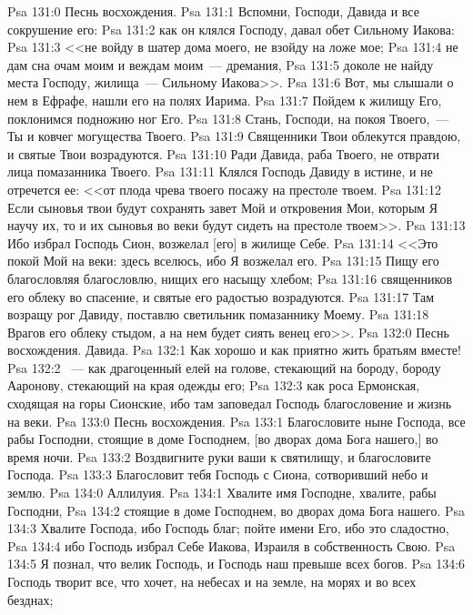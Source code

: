 \vs Psa 131:0 Песнь восхождения.
\rsbpar\vs Psa 131:1 Вспомни, Господи, Давида и все сокрушение его:
\vs Psa 131:2 как он клялся Господу, давал обет Сильному Иакова:
\vs Psa 131:3 <<не войду в шатер дома моего, не взойду на ложе мое;
\vs Psa 131:4 не дам сна очам моим и веждам моим~--- дремания,
\vs Psa 131:5 доколе не найду места Господу, жилища~--- Сильному Иакова>>.
\vs Psa 131:6 Вот, мы слышали о нем в Ефрафе, нашли его на полях Иарима.
\vs Psa 131:7 Пойдем к жилищу Его, поклонимся подножию ног Его.
\vs Psa 131:8 Стань, Господи, на  покоя Твоего,~--- Ты и ковчег могущества Твоего.
\vs Psa 131:9 Священники Твои облекутся правдою, и святые Твои возрадуются.
\vs Psa 131:10 Ради Давида, раба Твоего, не отврати лица помазанника Твоего.
\vs Psa 131:11 Клялся Господь Давиду в истине, и не отречется ее: <<от плода чрева твоего посажу на престоле твоем.
\vs Psa 131:12 Если сыновья твои будут сохранять завет Мой и откровения Мои, которым Я научу их, то и их сыновья во веки будут сидеть на престоле твоем>>.
\vs Psa 131:13 Ибо избрал Господь Сион, возжелал [его] в жилище Себе.
\vs Psa 131:14 <<Это покой Мой на веки: здесь вселюсь, ибо Я возжелал его.
\vs Psa 131:15 Пищу его благословляя благословлю, нищих его насыщу хлебом;
\vs Psa 131:16 священников его облеку во спасение, и святые его радостью возрадуются.
\vs Psa 131:17 Там возращу рог Давиду, поставлю светильник помазаннику Моему.
\vs Psa 131:18 Врагов его облеку стыдом, а на нем будет сиять венец его>>.
\vs Psa 132:0 Песнь восхождения. Давида.
\rsbpar\vs Psa 132:1 Как хорошо и как приятно жить братьям вместе!
\vs Psa 132:2 ~--- как драгоценный елей на голове, стекающий на бороду, бороду Ааронову, стекающий на края одежды его;
\vs Psa 132:3 как роса Ермонская, сходящая на горы Сионские, ибо там заповедал Господь благословение и жизнь на веки.
\vs Psa 133:0 Песнь восхождения.
\rsbpar\vs Psa 133:1 Благословите ныне Господа, все рабы Господни, стоящие в доме Господнем, [во дворах дома Бога нашего,] во время ночи.
\vs Psa 133:2 Воздвигните руки ваши к святилищу, и благословите Господа.
\vs Psa 133:3 Благословит тебя Господь с Сиона, сотворивший небо и землю.
\vs Psa 134:0 Аллилуия.
\rsbpar\vs Psa 134:1 Хвалите имя Господне, хвалите, рабы Господни,
\vs Psa 134:2 стоящие в доме Господнем, во дворах дома Бога нашего.
\vs Psa 134:3 Хвалите Господа, ибо Господь благ; пойте имени Его, ибо это сладостно,
\vs Psa 134:4 ибо Господь избрал Себе Иакова, Израиля в собственность Свою.
\vs Psa 134:5 Я познал, что велик Господь, и Господь наш превыше всех богов.
\vs Psa 134:6 Господь творит все, что хочет, на небесах и на земле, на морях и во всех безднах;
